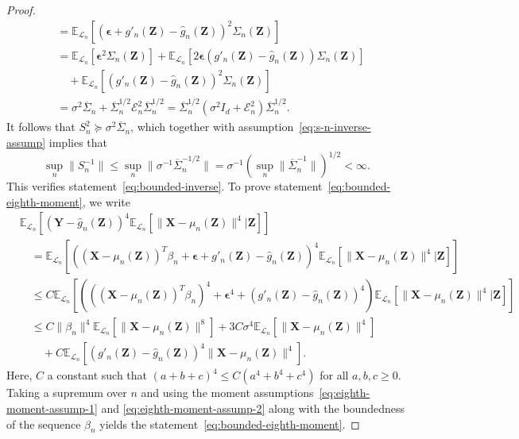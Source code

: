 \documentclass[12pt]{article}
\theoremstyle{definition}
\theoremstyle{remark}
\newcommand{\prx}{\bm X}
\newcommand{\prz}{\bm Z}
\newcommand{\pry}{{\bm Y}}
\newcommand{\peps}{\bm \epsilon}
\begin{document}
\begin{proof}
\begin{equation}
\begin{split}
		&=\mathbb E_{\mathcal L_n}[( \peps + g'_n(\prz)-\widehat g_n(\prz))^2 \Sigma_n(\prz)] \\
		& = \mathbb E_{\mathcal L_n}[\peps ^2 \Sigma_n(\prz)] + \mathbb E_{\mathcal L_n}[2\peps(g'_n(\prz)-\widehat g_n(\prz))\Sigma_n(\prz)]  \\
		&\quad + \mathbb E_{\mathcal L_n}[(g'_n(\prz)-\widehat g_n(\prz))^2\Sigma_n(\prz)] \\
		&= \sigma^2 \overline \Sigma_n + \overline \Sigma_n^{1/2}\mathcal E^2_n \overline \Sigma_n^{1/2}  = \overline \Sigma_n^{1/2}(\sigma^2 I_d + \mathcal E^2_n) \overline \Sigma_n^{1/2}.
		\label{eq:s-n-2-prime}
	\end{split}
\end{equation}
It follows that $S_n^2 \succcurlyeq \sigma^2 \overline \Sigma_n$, which together with assumption~\eqref{eq:s-n-inverse-assump} implies that
\begin{equation}
\sup_n \|S_n^{-1}\| \leq \sup_n \|\sigma^{-1}\overline \Sigma_n^{-1/2}\| = \sigma^{-1}\left(\sup_n \|\overline \Sigma_n^{-1}\|\right)^{1/2} < \infty.
\end{equation}
This verifies statement~\eqref{eq:bounded-inverse}.	To prove statement~\eqref{eq:bounded-eighth-moment}, we write
	\begin{equation*}
		\begin{split}
			&\mathbb E_{\mathcal L_n}\left[ (\pry - \widehat g_n(\prz))^{4}\mathbb E_{\mathcal L_n}[\|\prx - \mu_n(\prz)\|^{4}|\prz]\right] \\
			&\quad= \mathbb E_{\mathcal L_n}\left[ ((\prx - \mu_n(\prz))^T \beta_n + \peps + g'_n(\prz)-\widehat g_n(\prz))^4\mathbb E_{\mathcal L_n}[\|\prx - \mu_n(\prz)\|^{4}|\prz]\right] \\
			&\quad\leq C\mathbb E_{\mathcal L_n}\left[(((\prx - \mu_n(\prz))^T \beta_n)^4 + \peps^4 + (g'_n(\prz)-\widehat g_n(\prz))^4) \mathbb E_{\mathcal L_n}[\|\prx - \mu_n(\prz)\|^{4}|\prz]\right] \\
			&\quad\leq C\|\beta_n\|^4\mathbb E_{\mathcal L_n}[\|\prx - \mu_n(\prz)\|^{8}] + 3C\sigma^4\mathbb E_{\mathcal L_n}[\|\prx - \mu_n(\prz)\|^{4}] \\
			&\quad \quad + C \mathbb E_{\mathcal L_n}\left[(g'_n(\prz) - \widehat g_n(\prz))^{4} \|\prx - \mu_n(\prz)\|^{4}\right].
		\end{split}
	\end{equation*}
	Here, $C$ a constant such that $(a + b + c)^4 \leq C(a^4 + b^4 + c^4)$ for all $a,b,c \geq 0$. Taking a supremum over $n$ and using the moment assumptions~\eqref{eq:eighth-moment-assump-1} and \eqref{eq:eighth-moment-assump-2} along with the boundedness of the sequence $\beta_n$ yields the statement~\eqref{eq:bounded-eighth-moment}. 
	

\end{proof}
\end{document}
